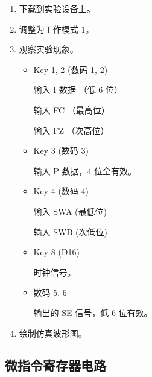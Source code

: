 \begin{enumerate}
    \item 下载到实验设备上。
    \item 调整为工作模式 1。
    \item 观察实验现象。
    
    \begin{itemize}
        \item Key 1, 2 (数码 1, 2)
        
        输入 I 数据 （低 6 位）
        
        输入 FC （最高位）
        
        输入 FZ （次高位）
        
        \item Key 3 (数码 3)
        
        输入 P 数据，4 位全有效。
        
        \item Key 4 (数码 4)
        
        输入 SWA (最低位)
        
        输入 SWB (次低位)
        
        \item Key 8 (D16)
        
        时钟信号。
        
        \item 数码 5, 6
        
        输出的 SE 信号，低 6 位有效。
        
    \end{itemize}
    \item 绘制仿真波形图。
\end{enumerate}

\subsection{微指令寄存器电路}

